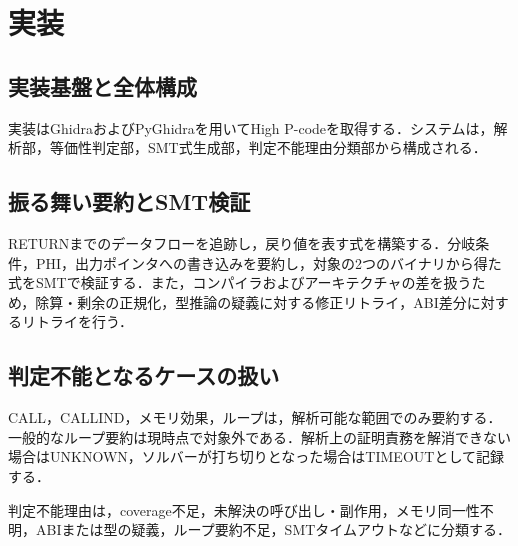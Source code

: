 \section{実装}

\subsection{実装基盤と全体構成}
実装はGhidraおよびPyGhidraを用いてHigh P-codeを取得する．システムは，解析部，等価性判定部，SMT式生成部，判定不能理由分類部から構成される．

\subsection{振る舞い要約とSMT検証}
RETURNまでのデータフローを追跡し，戻り値を表す式を構築する．分岐条件，PHI，出力ポインタへの書き込みを要約し，対象の2つのバイナリから得た式をSMTで検証する．また，コンパイラおよびアーキテクチャの差を扱うため，除算・剰余の正規化，型推論の疑義に対する修正リトライ，ABI差分に対するリトライを行う．

\subsection{判定不能となるケースの扱い}
CALL，CALLIND，メモリ効果，ループは，解析可能な範囲でのみ要約する．一般的なループ要約は現時点で対象外である．解析上の証明責務を解消できない場合はUNKNOWN，ソルバーが打ち切りとなった場合はTIMEOUTとして記録する．

判定不能理由は，coverage不足，未解決の呼び出し・副作用，メモリ同一性不明，ABIまたは型の疑義，ループ要約不足，SMTタイムアウトなどに分類する．
